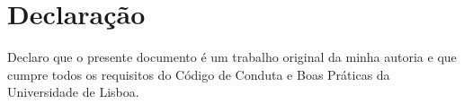 \section*{Declaração}


\noindent Declaro que o presente documento é um trabalho original da minha autoria e que cumpre todos os requisitos do Código de Conduta e Boas Práticas da Universidade de Lisboa. 